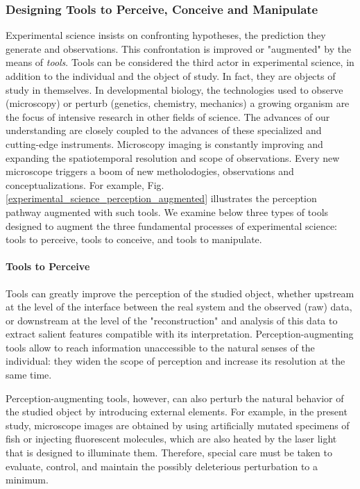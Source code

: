 \subsubsection{Designing Tools to Perceive, Conceive and Manipulate}


Experimental science insists on confronting hypotheses, the prediction they generate and observations. This confrontation is improved or "augmented" by the means of \textit{tools}. Tools can be considered the third actor in experimental science, in addition to the individual and the object of study. In fact, they are objects of study in themselves. In developmental biology, the technologies used to observe (microscopy) or perturb (genetics, chemistry, mechanics) a growing organism are the focus of intensive research in other fields of science. The advances of our understanding are closely coupled to the advances of these specialized and cutting-edge instruments. Microscopy imaging is constantly improving and expanding the spatiotemporal resolution and scope of observations. Every new microscope triggers a boom of new metholodogies, observations and conceptualizations. For example, Fig. \ref{experimental_science_perception_augmented} illustrates the perception pathway augmented with such tools. We examine below three types of tools designed to augment the three fundamental processes of experimental science: tools to perceive, tools to conceive, and tools to manipulate.

\paragraph{Tools to Perceive}


Tools can greatly improve the perception of the studied object, whether upstream at the level of the interface between the real system and the observed (raw) data, or downstream at the level of the "reconstruction" and analysis of this data to extract salient features compatible with its interpretation. Perception-augmenting tools allow to reach information unaccessible to the natural senses of the individual: they widen the scope of perception and increase its resolution at the same time.

Perception-augmenting tools, however, can also perturb the natural behavior of the studied object by introducing external elements. For example, in the present study, microscope images are obtained by using artificially mutated specimens of fish or injecting fluorescent molecules, which are also heated by the laser light that is designed to illuminate them. Therefore, special care must be taken to evaluate, control, and maintain the possibly deleterious perturbation to a minimum.


